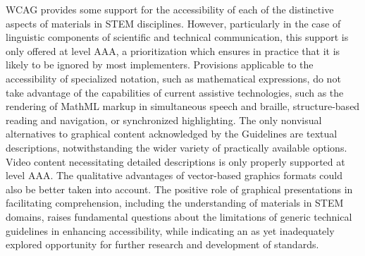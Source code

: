 \documentclass{sig-alternate} %
\begin{document}
\begin{large}
WCAG provides some support for the accessibility of each of the distinctive aspects of materials in STEM disciplines. However, particularly in the case of linguistic components of scientific and technical communication, this support is only offered at level AAA, a prioritization which ensures in practice that it is likely to be ignored by most implementers. Provisions applicable to the accessibility of specialized notation, such as mathematical expressions, do not take advantage of the capabilities of current assistive technologies, such as the rendering of MathML markup in simultaneous speech and braille, structure-based reading and navigation, or synchronized highlighting. The only nonvisual alternatives to graphical content acknowledged by the Guidelines are textual descriptions, notwithstanding the wider variety of practically available options. Video content necessitating detailed descriptions is only properly supported at level AAA. The qualitative advantages of vector-based graphics formats could also be better taken into account. The positive role of graphical presentations in facilitating comprehension, including the understanding of materials in STEM domains, raises fundamental questions about the limitations of gen\-eric technical guidelines in enhancing accessibility, while indicating an as yet inadequately explored opportunity for further research and development of standards.


\end{large}
\end{document}
